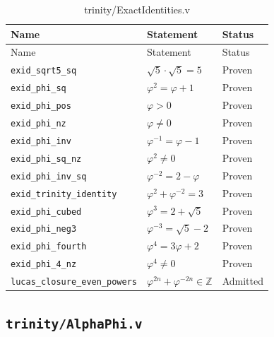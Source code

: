 \begin{longtable}{lll}
\toprule
Name & Statement & Status \\
\midrule
\endfirsthead
\toprule
Name & Statement & Status \\
\midrule
\endhead
\bottomrule
\endfoot
\bottomrule
\caption{trinity/ExactIdentities.v}
\endlastfoot
\texttt{exid\_sqrt5\_sq} & $\sqrt{5}\cdot\sqrt{5}=5$ & Proven \\
\texttt{exid\_phi\_sq} & $\varphi^{2}=\varphi+1$ & Proven \\
\texttt{exid\_phi\_pos} & $\varphi>0$ & Proven \\
\texttt{exid\_phi\_nz} & $\varphi\neq 0$ & Proven \\
\texttt{exid\_phi\_inv} & $\varphi^{-1}=\varphi-1$ & Proven \\
\texttt{exid\_phi\_sq\_nz} & $\varphi^{2}\neq 0$ & Proven \\
\texttt{exid\_phi\_inv\_sq} & $\varphi^{-2}=2-\varphi$ & Proven \\
\texttt{exid\_trinity\_identity} & $\varphi^{2}+\varphi^{-2}=3$ & Proven \\
\texttt{exid\_phi\_cubed} & $\varphi^{3}=2+\sqrt{5}$ & Proven \\
\texttt{exid\_phi\_neg3} & $\varphi^{-3}=\sqrt{5}-2$ & Proven \\
\texttt{exid\_phi\_fourth} & $\varphi^{4}=3\varphi+2$ & Proven \\
\texttt{exid\_phi\_4\_nz} & $\varphi^{4}\neq 0$ & Proven \\
\texttt{lucas\_closure\_even\_powers} &
  $\varphi^{2n}+\varphi^{-2n}\in\mathbb{Z}$ & Admitted \\
\end{longtable}

\subsection{\texttt{trinity/AlphaPhi.v}}
\label{sec:A-coq-alphaphi}

